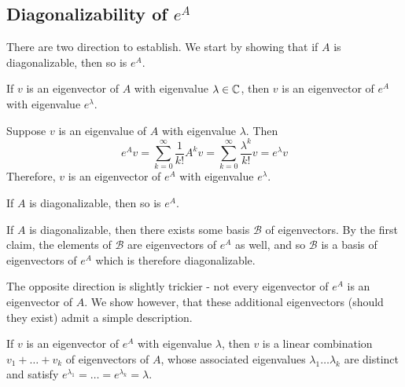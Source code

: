 \documentclass{scrartcl}
\begin{document}
\newpage

\subsection{Diagonalizability of $e^A$}
\begin{solution} There are two direction to establish. We start by showing that if $A$ is diagonalizable, then so is $e^A$.
    \begin{claimbox}
    If $v$ is an eigenvector of $A$ with eigenvalue $\lambda\in \mathbb C$, then $v$ is an eigenvector of $e^A$ with eigenvalue $e^\lambda$.
    \end{claimbox}
    \begin{tproof}
    Suppose $v$ is an eigenvalue of $A$ with eigenvalue $\lambda$. Then 
    \[e^Av=\sum_{k=0}^{\infty}\frac{1}{k!}A^kv=\sum_{k=0}^{\infty}\frac{\lambda^k}{k!}v=e^\lambda v\]
    Therefore, $v$ is an eigenvector of $e^A$
     with eigenvalue $e^\lambda$.
     \end{tproof}
    
    \begin{claimbox}
    If $A$ is diagonalizable, then so is $e^A$.
    \end{claimbox}
    \begin{tproof}
    If $A$ is diagonalizable, then there exists some basis $\mathcal{B}$ of eigenvectors. By the first claim, the elements of $\mathcal{B}$ are eigenvectors of $e^A$ as well, and so $\mathcal{B}$ is a basis of eigenvectors of $e^A$ which is therefore diagonalizable.
    \end{tproof}
    
    The opposite direction is slightly trickier - not every eigenvector of $e^A$ is an eigenvector of $A$. We show however, that these additional eigenvectors (should they exist) admit a simple description. 
    
    \begin{claimbox}
    If $v$ is an eigenvector of $e^A$ with eigenvalue $\lambda$, then $v$ is a linear combination $v_1+\dots +v_k$ of eigenvectors of $A$, whose associated eigenvalues $\lambda_1\dots \lambda_k$ are distinct and satisfy $e^{\lambda_1}=\dots=e^{\lambda_k}=\lambda$.
    \end{claimbox}
        

\end{solution}
\end{document}
